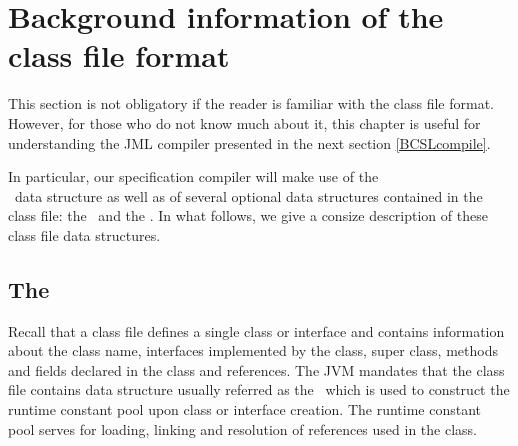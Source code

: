 \section{Background information of the class file format}
This section is not obligatory if the reader is familiar with the class file format.
However, for those who do not know much about it, this chapter is useful for 
understanding the JML compiler presented in the next section \ref{BCSLcompile}.


 In particular, our specification compiler will make use of the \\
 \constantPool \ data structure as well as of several optional data structures
 contained in the  class file: the \localVariableTable \ and the \lineNumberTable. 
In what follows, we give a consize description of these class file data structures. 


\subsection{The \constantPool}
 Recall that a class file defines
a single class or interface and contains information about  the class name, interfaces implemented by the class, super class, methods
 and fields declared in the class and references. The JVM  \cite{VMSpec} mandates that the class
 file contains data structure usually referred as the \constantPool \ which is used to construct the runtime constant pool upon class or 
interface creation. The runtime constant pool serves for loading, linking and resolution of references used in the class.


